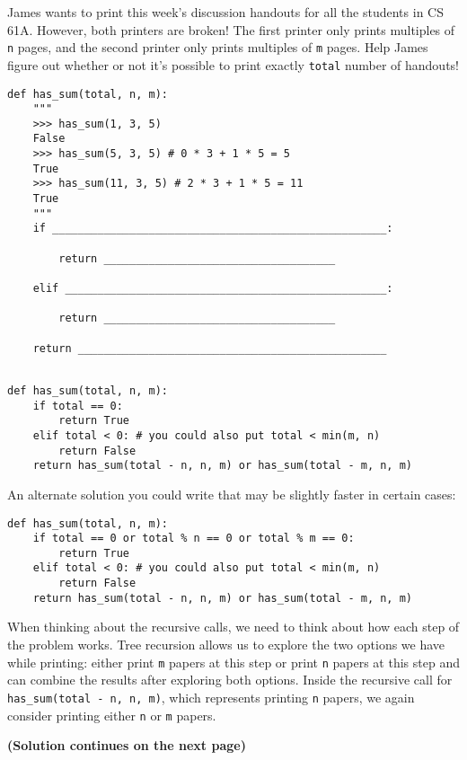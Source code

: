 \begin{blocksection}
\question James wants to print this week's discussion handouts for all the students in CS 61A.
However, both printers are broken! The first printer only prints multiples of \lstinline$n$
pages, and the second printer only prints multiples of \lstinline$m$ pages. Help James figure
out whether or not it's possible to print exactly \lstinline$total$ number of handouts! \\

\begin{lstlisting}
def has_sum(total, n, m):
    """
    >>> has_sum(1, 3, 5)
    False
    >>> has_sum(5, 3, 5) # 0 * 3 + 1 * 5 = 5
    True
    >>> has_sum(11, 3, 5) # 2 * 3 + 1 * 5 = 11
    True
    """
    if ____________________________________________________:
		
        return ____________________________________
				
    elif __________________________________________________:
		
        return ____________________________________
				
    return ________________________________________________
    
\end{lstlisting}

\begin{solution}[1.5in]
\begin{lstlisting}
def has_sum(total, n, m):
    if total == 0:
        return True
    elif total < 0: # you could also put total < min(m, n)
        return False
    return has_sum(total - n, n, m) or has_sum(total - m, n, m)
\end{lstlisting}
An alternate solution you could write that may be slightly faster in certain cases:
\begin{lstlisting}
def has_sum(total, n, m):
    if total == 0 or total % n == 0 or total % m == 0:
        return True
    elif total < 0: # you could also put total < min(m, n)
        return False
    return has_sum(total - n, n, m) or has_sum(total - m, n, m)
\end{lstlisting}
When thinking about the recursive calls, we need to think about how each step of the problem works. Tree recursion allows us to explore the two options we have while printing: either print \lstinline{m} papers at this step or print \lstinline{n} papers at this step and can combine the results after exploring both options. Inside the recursive call for \lstinline{has_sum(total - n, n, m)}, which represents printing \lstinline{n} papers, we again consider printing either \lstinline{n} or \lstinline{m} papers.

\textbf{(Solution continues on the next page)}
\end{solution}
\end{blocksection}

